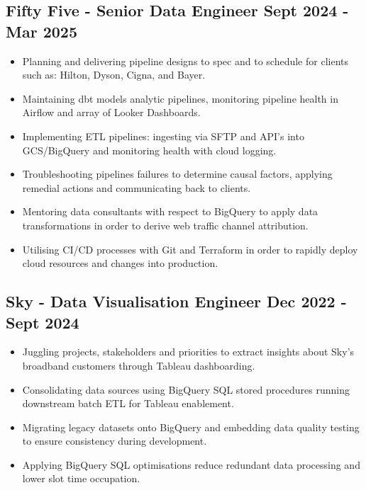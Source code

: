 \documentclass[a4paper,9pt]{article}
\begin{document}
\subsection*{\textbf{Fifty Five - Senior Data Engineer} \hfill  Sept 2024 - Mar 2025}
\begin{itemize}[noitemsep]
    \item Planning and delivering pipeline designs to spec and to schedule for clients such as: Hilton, Dyson, Cigna, and Bayer.
    \item Maintaining dbt models analytic pipelines, monitoring pipeline health in Airflow and array of Looker Dashboards.
    \item Implementing ETL pipelines: ingesting via SFTP and API's into GCS/BigQuery and monitoring health with cloud logging.
    \item Troubleshooting pipelines failures to determine causal factors, applying remedial actions and communicating back to clients.
    \item Mentoring data consultants with respect to BigQuery to apply data transformations in order to derive web traffic channel attribution.
    \item Utilising CI/CD processes with Git and Terraform in order to rapidly deploy cloud resources and changes into production.
\end{itemize}

\subsection*{\textbf{Sky - Data Visualisation Engineer} \hfill  Dec 2022 - Sept 2024}
\begin{itemize}[noitemsep]
    \item Juggling projects, stakeholders and priorities to extract insights about Sky's broadband customers through Tableau dashboarding.
    \item Consolidating data sources using BigQuery SQL stored procedures running downstream batch ETL for Tableau enablement.
    \item Migrating legacy datasets onto BigQuery and embedding data quality testing to ensure consistency during development.
    \item Applying BigQuery SQL optimisations reduce redundant data processing and lower slot time occupation.
\end{itemize}
\end{document}
